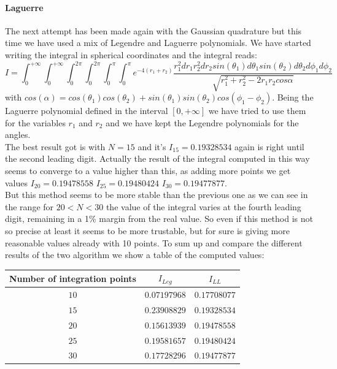 \documentclass[10pt,a4paper,titlepage]{article}
\begin{document}
\paragraph{Laguerre}The next attempt has been made again with the Gaussian quadrature but this time we have used a mix of Legendre and Laguerre polynomials. We have started writing the integral in spherical coordinates and the integral reads: \begin{equation} I=\int_{0}^{+\infty}\int_{0}^{+\infty}\int_{0}^{2 \pi}\int_{0}^{2 \pi}\int_{0}^{\pi}\int_{0}^{\pi} e^{-4(r_1+r_2)}\frac{r_1^2dr_1r_2^2dr_2sin(\theta_1)d\theta_1sin(\theta_2)d\theta_2d\phi_1d\phi_2}{\sqrt{r_1^2+r_2^2-2r_1r_2cos\alpha}}
\end{equation}
with $cos(\alpha)=cos(\theta_1)cos(\theta_2)+sin(\theta_1)sin(\theta_2)cos(\phi_1-\phi_2)$. Being the Laguerre polynomial defined in the interval $[0,+\infty]$ we have tried to use them for the variables $r_1$ and $r_2$ and we have kept the Legendre polynomials for the angles. 
\\
The best result got is with $N=15$ and it's $I_{15}=0.19328534$ again is right until the second leading digit. Actually the result of the integral computed in this way seems to converge to a value higher than this, as adding more points we get values $I_{20}=0.19478558$ $I_{25}=0.19480424$ $I_{30}=0.19477877$.
\\
But this method seems to be more stable than the previous one as we can see in the range for $20<N<30$ the value of the integral varies at the fourth leading digit, remaining in a 1\% margin from the real value. So even if this method is not so precise at least it seems to be more trustable, but for sure is giving more reasonable values already with 10 points. To sum up and compare the different results of the two algorithm we show a table of the computed values:
\begin{center}
\begin{tabular}{|c|c|c|}
\hline
Number of integration points          &  $I_{Leg}$    &  $I_{LL}$               \\\hline
$10$ &  $0.07197968$ & $0.17708077$ \\\hline
$15$ & $0.23908829$ & $0.19328534$ \\\hline
$20$ & $0.15613939$ & $0.19478558$  \\\hline
$25$ & $0.19581657$ & $0.19480424$  \\\hline
$30$ & $0.17728296$ & $ 0.19477877$ \\\hline
\end{tabular}

\end{center}
\end{document}
